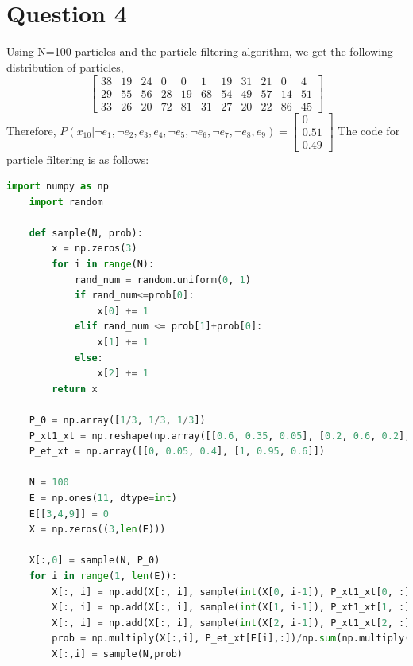\documentclass[letter, 9pt]{article}
\begin{document}
\section*{Question 4}Using N=100 particles and the particle filtering algorithm, we get the following distribution of particles,
\begin{equation*}
    \begin{bmatrix}
    38 & 19 & 24 & 0 & 0 & 1 & 19 & 31 & 21 & 0 & 4\\
    29 & 55 & 56 & 28 & 19 & 68 & 54 & 49 & 57 & 14 & 51\\
    33 & 26 & 20 & 72 & 81 & 31 & 27 & 20 & 22 & 86 & 45
    \end{bmatrix}
\end{equation*}
Therefore, $P(x_{10}|\neg e_1, \neg e_2, e_3, e_4, \neg e_5, \neg e_6, \neg e_7, \neg e_8, e_9) = \begin{bmatrix}0\\0.51\\0.49\end{bmatrix}$
The code for particle filtering is as follows:
\begin{lstlisting}[language=Python]
    import numpy as np
    import random
    
    def sample(N, prob):
        x = np.zeros(3)
        for i in range(N):
            rand_num = random.uniform(0, 1)
            if rand_num<=prob[0]:
                x[0] += 1
            elif rand_num <= prob[1]+prob[0]:
                x[1] += 1
            else:
                x[2] += 1
        return x
    
    P_0 = np.array([1/3, 1/3, 1/3])
    P_xt1_xt = np.reshape(np.array([[0.6, 0.35, 0.05], [0.2, 0.6, 0.2], [0, 0.5, 0.5]]), (3, 3))
    P_et_xt = np.array([[0, 0.05, 0.4], [1, 0.95, 0.6]])

    N = 100
    E = np.ones(11, dtype=int)
    E[[3,4,9]] = 0
    X = np.zeros((3,len(E)))
    
    X[:,0] = sample(N, P_0)
    for i in range(1, len(E)):
        X[:, i] = np.add(X[:, i], sample(int(X[0, i-1]), P_xt1_xt[0, :]))
        X[:, i] = np.add(X[:, i], sample(int(X[1, i-1]), P_xt1_xt[1, :]))
        X[:, i] = np.add(X[:, i], sample(int(X[2, i-1]), P_xt1_xt[2, :]))
        prob = np.multiply(X[:,i], P_et_xt[E[i],:])/np.sum(np.multiply(X[:,i], P_et_xt[E[i],:]))
        X[:,i] = sample(N,prob)
\end{lstlisting}

\newpage
\end{document}
